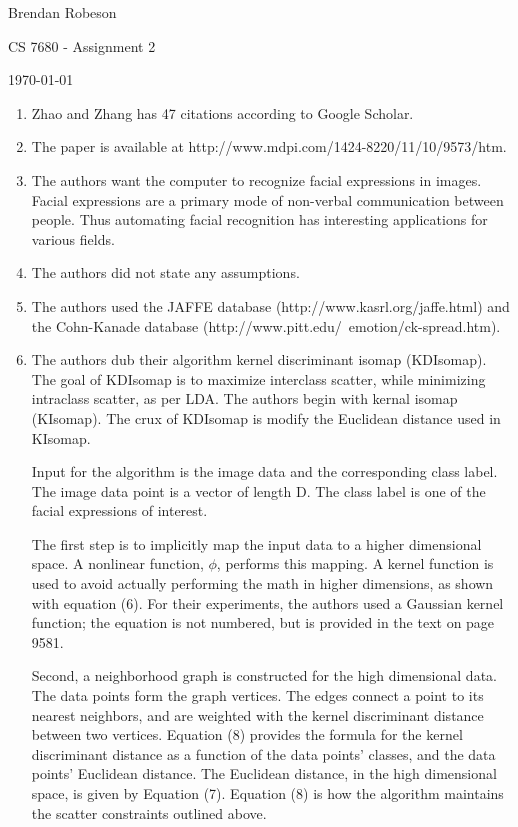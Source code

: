 \documentclass[11pt]{article}
\begin{document}
\noindent Brendan Robeson

\noindent CS 7680 - Assignment 2

\noindent \today

\medskip

\begin{enumerate}
    \item Zhao and Zhang \cite{s111009573} has 47 citations according to Google
        Scholar.

    \item The paper is available at
        http://www.mdpi.com/1424-8220/11/10/9573/htm.

    \item The authors want the computer to recognize facial expressions in
        images. Facial expressions are a primary mode of non-verbal
        communication between people. Thus automating facial recognition has
        interesting applications for various fields.

    \item The authors did not state any assumptions.

    \item The authors used the JAFFE database (http://www.kasrl.org/jaffe.html)
        and the Cohn-Kanade database
        (http://www.pitt.edu/~emotion/ck-spread.htm).

    \item The authors dub their algorithm kernel discriminant isomap (KDIsomap).
        The goal of KDIsomap is to maximize interclass scatter, while minimizing
        intraclass scatter, as per LDA. The authors begin with kernal isomap
        (KIsomap). The crux of KDIsomap is modify the Euclidean distance used in
        KIsomap.

        Input for the algorithm is the image data and the corresponding class
        label. The image data point is a vector of length D. The class label is
        one of the facial expressions of interest.

        The first step is to implicitly map the input data to a higher dimensional
        space. A nonlinear function, \(\phi\), performs this mapping. A kernel
        function is used to avoid actually performing the math in higher
        dimensions, as shown with equation (6). For their experiments, the
        authors used a Gaussian kernel function; the equation is not numbered,
        but is provided in the text on page 9581.

        Second, a neighborhood graph is constructed for the high dimensional
        data. The data points form the graph vertices. The edges connect a point
        to its nearest neighbors, and are weighted with the kernel discriminant
        distance between two vertices. Equation (8) provides the formula for the
        kernel discriminant distance as a function of the data points' classes,
        and the data points' Euclidean distance. The Euclidean distance, in the
        high dimensional space, is given by Equation (7). Equation (8) is how
        the algorithm maintains the scatter constraints outlined above.


\end{enumerate}
\end{document}
